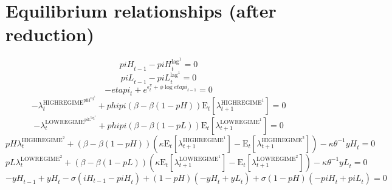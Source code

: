 \section{Equilibrium relationships (after reduction)}

\begin{equation}
{p\!i\!H}_{t-1} - {p\!i\!H}^{\mathrm{lag}^{\mathrm{1}}}_{t} = 0
\end{equation}
\begin{equation}
{p\!i\!L}_{t-1} - {p\!i\!L}^{\mathrm{lag}^{\mathrm{1}}}_{t} = 0
\end{equation}
\begin{equation}
-{e\!t\!a\!p\!i}_{t} + e^{\epsilon^{\pi}_{t} + {\phi} {\log{{e\!t\!a\!p\!i}_{t-1}}}} = 0
\end{equation}
\begin{equation}
-\lambda^{\mathrm{HIGHREGIME}^{\mathrm{piH}^{\mathrm{lag}^{\mathrm{1}}}}}_{t} + {{p\!h\!i\!p\!i}} \left(\beta - {\beta} \left(1 - {p\!H}\right)\right) {\mathrm{E}_{t}\left[\lambda^{\mathrm{HIGHREGIME}^{\mathrm{1}}}_{t+1}\right]} = 0
\end{equation}
\begin{equation}
-\lambda^{\mathrm{LOWREGIME}^{\mathrm{piL}^{\mathrm{lag}^{\mathrm{1}}}}}_{t} + {{p\!h\!i\!p\!i}} \left(\beta - {\beta} \left(1 - {p\!L}\right)\right) {\mathrm{E}_{t}\left[\lambda^{\mathrm{LOWREGIME}^{\mathrm{1}}}_{t+1}\right]} = 0
\end{equation}
\begin{equation}
{{p\!H}} {\lambda^{\mathrm{HIGHREGIME}^{\mathrm{2}}}_{t}} + \left(\beta - {\beta} \left(1 - {p\!H}\right)\right) \left({\kappa} {\mathrm{E}_{t}\left[\lambda^{\mathrm{HIGHREGIME}^{\mathrm{1}}}_{t+1}\right]} - \mathrm{E}_{t}\left[\lambda^{\mathrm{HIGHREGIME}^{\mathrm{2}}}_{t+1}\right]\right) - {\kappa} {\theta}^{-1} {{y\!H}_{t}} = 0
\end{equation}
\begin{equation}
{{p\!L}} {\lambda^{\mathrm{LOWREGIME}^{\mathrm{2}}}_{t}} + \left(\beta - {\beta} \left(1 - {p\!L}\right)\right) \left({\kappa} {\mathrm{E}_{t}\left[\lambda^{\mathrm{LOWREGIME}^{\mathrm{1}}}_{t+1}\right]} - \mathrm{E}_{t}\left[\lambda^{\mathrm{LOWREGIME}^{\mathrm{2}}}_{t+1}\right]\right) - {\kappa} {\theta}^{-1} {{y\!L}_{t}} = 0
\end{equation}
\begin{equation}
-{y\!H}_{t-1} + {y\!H}_{t} - {\sigma} \left({i\!H}_{t-1} - {p\!i\!H}_{t}\right) + \left(1 - {p\!H}\right) \left(-{y\!H}_{t} + {y\!L}_{t}\right) + {\sigma} \left(1 - {p\!H}\right) \left(-{p\!i\!H}_{t} + {p\!i\!L}_{t}\right) = 0
\end{equation}
